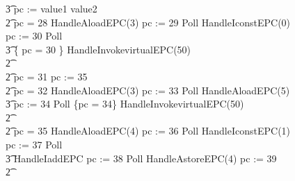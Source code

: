 \begin{figure}[tp!]
{\begin{circus}
    \t3 pc := \IF value1 \leq value2   \\
    \t2 {} \circelse pc = 28 \circthen HandleAloadEPC(3) \circseq pc := 29 \circseq Poll \circseq HandleIconstEPC(0) \circseq pc := 30 \circseq Poll \circseq \\
    \t3 \{ pc = 30 \} \circseq HandleInvokevirtualEPC(50) \\
    \t2 {} \cdots {} \\ 
    \t2 {} \circelse pc = 31 \circthen pc := 35 \\
    \t2 {} \circelse pc = 32 \circthen HandleAloadEPC(3) \circseq pc := 33 \circseq Poll \circseq HandleAloadEPC(5) \circseq \\
    \t3 pc := 34 \circseq Poll \circseq \{pc = 34\} \circseq HandleInvokevirtualEPC(50) \\
    \t2 {} \cdots {} \\
    \t2 {} \circelse pc = 35 \circthen HandleAloadEPC(4) \circseq pc := 36 \circseq Poll \circseq HandleIconstEPC(1) \circseq pc := 37 \circseq Poll \circseq \\
    \t3 HandleIaddEPC \circseq pc := 38 \circseq Poll \circseq HandleAstoreEPC(4) \circseq pc := 39 \\
    \t2 {} \cdots {} \\

\end{circus}}
\end{figure}
